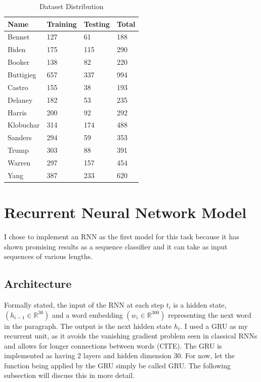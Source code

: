\documentclass{article}
\begin{document}
\begin{table}[htb]
 \caption{Dataset Distribution}
  \centering
  \begin{tabular}{llll}
    \toprule
    \cmidrule(r){1-2}
    Name     & Training     & Testing    & Total  \\
    \midrule
    Bennet & 127  & 61    &  188 \\
    Biden  & 175  & 115     & 290\\
    Booker & 138  &  82 & 220\\
    Buttigieg & 657 & 337 & 994 \\
    Castro & 155 & 38 & 193\\
    Delaney & 182 & 53 & 235\\
    Harris & 200 & 92 & 292\\
    Klobuchar & 314 & 174 & 488\\
    Sanders & 294 & 59 & 353\\
    Trump & 303 & 88 & 391\\
    Warren & 297 & 157 & 454\\
    Yang & 387 & 233 & 620\\
    \bottomrule
  \end{tabular}
  \label{tab:table}
\end{table}

\section{Recurrent Neural Network Model}
I chose to implement an RNN as the first model for this task because it has shown promising results as a sequence classifier \cite{nnprimer} and it can take as input sequences of various lengths.

\subsection{Architecture}
Formally stated, the input of the RNN at each step $t_i$ is a hidden state, $(h_{i-1} \in \mathbb{R}^{30})$ and a word embedding $(w_i \in \mathbb{R}^{300})$ representing the next word in the paragraph. The output is the next hidden state $h_i.$ I used a GRU as my recurrent unit, as it avoids the vanishing gradient problem seen in classical RNNs and allows for longer connections between words (CITE). The GRU is implemented as having 2 layers and hidden dimension 30. For now, let the function being applied by the GRU simply be called GRU. The following subsection will discuss this in more detail.
\end{document}
